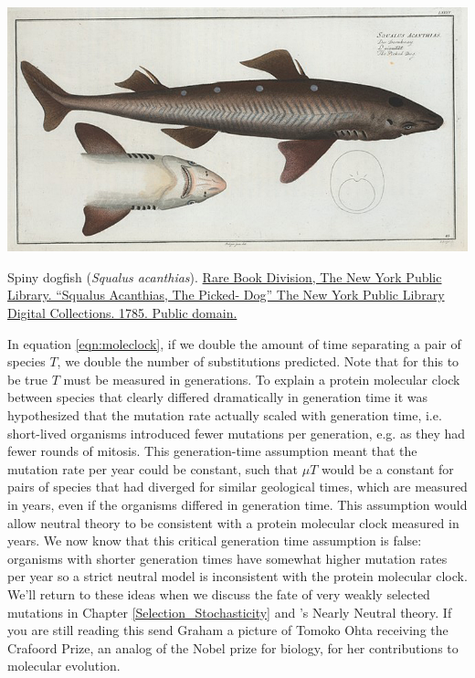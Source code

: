 \begin{marginfigure}
\begin{center}
\includegraphics[width= \textwidth]{illustration_images/Genetic_drift/dogfish/dogfish.jpg}
\end{center}
\caption{Spiny dogfish ({\it Squalus acanthias}). \newline \noindent \tiny{ \href{http://digitalcollections.nypl.org/items/510d47da-6930-a3d9-e040-e00a18064a99}{Rare Book Division, The New York Public Library. ``Squalus Acanthias, The Picked- Dog'' The New York Public Library Digital Collections. 1785. Public domain.}}}
\label{fig:dogfish}
\end{marginfigure}

In equation \eqref{eqn:moleclock}, if we double the amount of time separating a pair of species $T$, we double the number of substitutions predicted. Note that for this to be true $T$ must be measured in generations. To explain a protein molecular clock between species that clearly differed dramatically in generation time it was hypothesized that the mutation rate actually scaled with generation time, i.e. short-lived organisms introduced fewer mutations per generation, e.g. as they had fewer rounds of mitosis. This generation-time assumption meant that the mutation rate per year could be constant, such that $\mu T$ would be a constant for pairs of species that had diverged for similar geological times, which are measured in years, even if the organisms differed in generation time. This assumption would allow neutral theory to be consistent with a protein molecular clock measured in years. We now know that this critical generation time assumption is false: organisms with shorter generation times have somewhat higher mutation rates per year so a strict neutral model is inconsistent with the protein molecular clock. We'll return to these ideas when we discuss the fate of very weakly selected mutations in Chapter \ref{Selection_Stochasticity} and \citet{ohta1973slightly}'s Nearly Neutral theory. If you are still reading this send Graham a picture of Tomoko Ohta receiving the Crafoord Prize, an analog of the Nobel prize for biology, for her contributions to molecular evolution.


